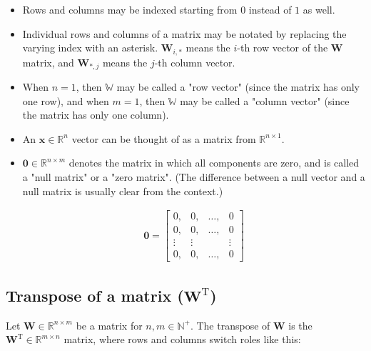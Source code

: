 \documentclass[titlepage]{article}
\begin{document}
        \begin{itemize}
          \item Rows and columns may be indexed starting from $0$ instead of $1$
                as well.

          \item Individual rows and columns of a matrix may be notated by
                replacing the varying index with an asterisk. $\mathbf{W}_{i,*}$
                means the $i$-th row vector of the $\mathbf{W}$ matrix, and
                $\mathbf{W}_{*,j}$ means the $j$-th column vector.

          \item When $n = 1$, then $\mathbb{W}$ may be called a "row vector"
                (since the matrix has only one row), and when $m = 1$, then
                $\mathbb{W}$ may be called a "column vector" (since the matrix
                has only one column).

          \item An $\mathbf{x} \in \mathbb{R}^n$ vector can be thought of as a
                matrix from $\mathbb{R}^{n \times 1}$.

          \item $\mathbf{0} \in \mathbb{R}^{n \times m}$ denotes the matrix in
                which all components are zero, and is called a "null matrix" or
                a "zero matrix". (The difference between a null vector and a
                null matrix is usually clear from the context.)

                \begin{align*}
                  \mathbf{0}
                    = \begin{bmatrix}
                        0, & 0, & \ldots, & 0 \\
                        0, & 0, & \ldots, & 0 \\
                        \vdots & \vdots & & \vdots \\
                        0, & 0, & \ldots, & 0
                      \end{bmatrix}
                \end{align*}
        \end{itemize}

      \subsection{Transpose of a matrix ($\mathbf{W}^\mathrm{T}$)}

        Let $\mathbf{W} \in \mathbb{R}^{n \times m}$ be a matrix for
        $n, m \in \mathbb{N}^+$. The transpose of $\mathbf{W}$ is the
        $\mathbf{W}^\mathrm{T} \in \mathbb{R}^{m \times n}$ matrix, where
        rows and columns switch roles like this:
\end{document}
